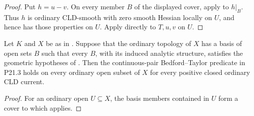 \begin{proof}
Put \(h=u-v\).  On every member \(B\) of the displayed cover, apply
 to \(h|_B\).  Thus \(h\) is
ordinary CLD-smooth with zero smooth Hessian locally on \(U\), and hence has
those properties on \(U\).  Apply  directly to
\(T,u,v\) on \(U\).
\end{proof}

\begin{corollary}
\label{cor:p213-residual-picard-mixed-tower-basis-bt}
Let \(K\) and \(X\) be as in
.  Suppose that the
ordinary topology of \(X\) has a basis of open sets \(B\) such that every
\(B\), with its induced analytic structure, satisfies the geometric
hypotheses of .  Then the
continuous-pair Bedford--Taylor predicate in P21.3 holds on every ordinary
open subset of \(X\) for every positive closed ordinary CLD current.
\end{corollary}

\begin{proof}
For an ordinary open \(U\subseteq X\), the basis members contained in \(U\)
form a cover to which
 applies.
\end{proof}
